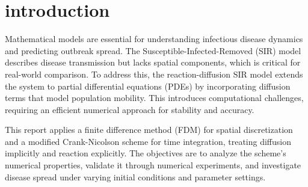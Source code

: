 \section{introduction}
Mathematical models are essential for understanding infectious disease dynamics and predicting outbreak spread. 
The Susceptible-Infected-Removed (SIR) model describes disease transmission but lacks spatial components, 
which is critical for real-world comparison. To address this, the reaction-diffusion SIR model extends 
the system to partial differential equations (PDEs) by incorporating diffusion terms that model population 
mobility. This introduces computational challenges, requiring an efficient numerical approach for stability 
and accuracy.  

This report applies a finite difference method (FDM) for spatial discretization and a modified Crank-Nicolson 
scheme for time integration, treating diffusion implicitly and reaction explicitly. The objectives are to 
analyze the scheme’s numerical properties, validate it through numerical experiments, and investigate disease 
spread under varying initial conditions and parameter settings.
